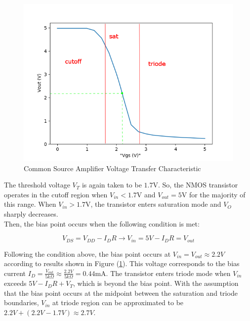 \FloatBarrier

\begin{figure}[h!]
	\centering
	\includegraphics[scale=0.75]{./data/common_source_edited.png}
	\caption{Common Source Amplifier Voltage Transfer Characteristic}
	\label{fig:common_source}
\end{figure}

\FloatBarrier

The threshold voltage $V_T$ is again taken to be $1.7$\si{\volt}.
So, the NMOS transistor operates in the cutoff region when $V_{in} < 1.7$\si{\volt} and $V_{out} = 5$\si{\volt} for the majority of this range.
When $V_{in} > 1.7$\si{\volt}, the transistor enters saturation mode and $V_{O}$ sharply decreases. \\
Then, the bias point occurs when the following condition is met:

\begin{equation}
	\label{eq:bias_nmos_csa}
	V_{DS} = V_{DD} - I_{D}R \rightarrow V_{in} = 5V - I_{D}R = V_{out}
\end{equation}

Following the condition above, the bias point occurs at $V_{in} = V_{out} \approx 2.2V$ according to results shown in Figure (\ref{fig:common_source}).
This voltage corresponds to the bias current $I_{D} = \frac{V_{out}}{5k\Omega} \approx \frac{2.2V}{5k\Omega} = 0.44$\si{\milli\ampere}.
The transistor enters triode mode when $V_{in}$ exceeds $5V - I_{D}R + V_T$, which is beyond the bias point.
With the assumption that the bias point occurs at the midpoint between the saturation and triode boundaries, $V_{in}$ at triode region can be approximated to be $2.2V + (2.2V - 1.7V) \approx 2.7V$.


